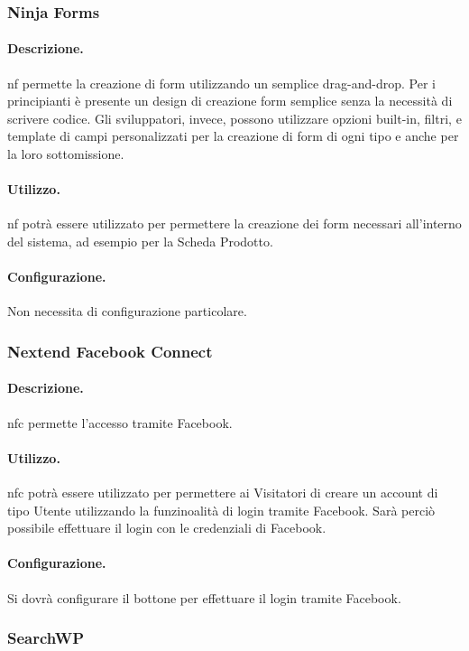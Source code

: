 \subsubsection{Ninja Forms} \label{plugin:nf}
\paragraph{Descrizione.} \gls{nf} permette la creazione di form utilizzando un semplice drag-and-drop. Per i principianti è presente un design di creazione form semplice senza la necessità di scrivere codice. Gli sviluppatori, invece, possono utilizzare opzioni built-in, filtri, e template di campi personalizzati per la creazione di form di ogni tipo e anche per la loro sottomissione.
\paragraph{Utilizzo.} \gls{nf} potrà essere utilizzato per permettere la creazione dei form necessari all'interno del sistema, ad esempio per la Scheda Prodotto.
\paragraph{Configurazione.} Non necessita di configurazione particolare.

\subsubsection{Nextend Facebook Connect} \label{plugin:nfc}
\paragraph{Descrizione.} \gls{nfc} permette l'accesso tramite Facebook.
\paragraph{Utilizzo.} \gls{nfc} potrà essere utilizzato per permettere ai Visitatori di creare un account di tipo Utente utilizzando la funzinoalità di login tramite Facebook. Sarà perciò possibile effettuare il login con le credenziali di Facebook.
\paragraph{Configurazione.} Si dovrà configurare il bottone per effettuare il login tramite Facebook.

\subsubsection{SearchWP} \label{plugin:wps}
